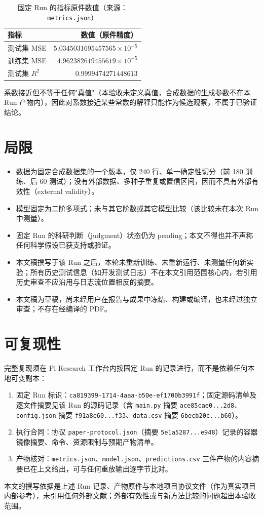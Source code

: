 \documentclass[a4paper,11pt]{article}
\begin{document}
\begin{table}[htbp]
\centering
\caption{固定 Run 的指标原件数值（来源：\texttt{metrics.json}）}
\label{tab:metrics}
\begin{tabular}{lr}
\toprule
指标 & 数值（原件精度） \\
\midrule
测试集 MSE & $5.0345031695457565\times10^{-5}$ \\
训练集 MSE & $4.962382619455619\times10^{-5}$ \\
测试集 $R^2$ & $0.9999474271448613$ \\
\bottomrule
\end{tabular}
\end{table}

系数接近但不等于任何"真值"（本验收未定义真值，合成数据的生成参数不在本 Run 产物内），因此对系数接近某些常数的解释只能作为候选观察，不属于已验证结论。

\section{局限}

\begin{itemize}
\item 数据为固定合成数据集的一个版本，仅 240 行、单一确定性切分（前 180 训练、后 60 测试）；没有外部数据、多种子重复或置信区间，因而不具有外部有效性（external validity）。
\item 模型固定为二阶多项式；未与其它阶数或其它模型比较（该比较未在本次 Run 中测量）。
\item 固定 Run 的科研判断（judgment）状态仍为 pending；本文不得也并不声称任何科学假设已获支持或验证。
\item 本文稿撰写于该 Run 之后，本轮未重新训练、未重新运行、未测量任何新实验；所有历史测试信息（如开发测试日志）不在本文引用范围核心内，若引用历史审查不应沿用与日志流位置相反的摘要。
\item 本文稿为草稿，尚未经用户在报告与成果中冻结、构建或编译，也未经过独立审查；不存在经编译的 PDF。
\end{itemize}

\section{可复现性}

完整复现须在 Pi Research 工作台内按固定 Run 的记录进行，而不是依赖任何本地可变副本：
\begin{enumerate}
\item 固定 Run 标识：\texttt{ca819399-1714-4aaa-b50e-ef1700b3991f}；固定源码清单及逐文件摘要见该 Run 的源码记录（含 \texttt{main.py} 摘要 \texttt{ace85cae0...2d8}、\texttt{config.json} 摘要 \texttt{f91a8e60...f33}、\texttt{data.csv} 摘要 \texttt{6becb20c...b60}）。
\item 执行合同：协议 \texttt{paper-protocol.json}（摘要 \texttt{5e1a5287...e948}）记录的容器镜像摘要、命令、资源限制与预期产物清单。
\item 产物核对：\texttt{metrics.json}、\texttt{model.json}、\texttt{predictions.csv} 三件产物的内容摘要已在上文给出，可与任何重放输出逐字节比对。
\end{enumerate}
本文的撰写依据是上述 Run 记录、产物原件与本地项目协议文件（作为真实项目内部参考），未引用任何外部文献；外部有效性或与新方法比较的问题超出本验收范围。
\end{document}
